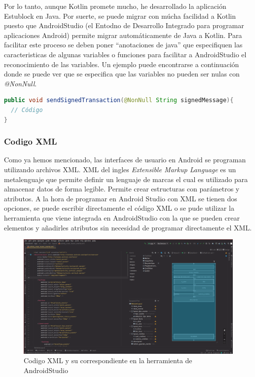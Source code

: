 Por lo tanto, aunque Kotlin promete mucho, he desarrollado la aplicación Estublock en Java. Por suerte, se puede migrar con múcha facilidad a Kotlin puesto que AndroidStudio (el Entodno de Desarrollo Integrado para programar aplicaciones Android) permite migrar automáticamente de Java a Kotlin. Para facilitar este proceso se deben poner ``anotaciones de java'' que especifiquen las caracteristicas de algunas variables o funciones para facilitar a AndroidStudio el reconocimiento de las variables. Un ejemplo puede encontrarse a continuación donde se puede ver que se especifica que las variables no pueden ser nulas con \emph{@NonNull}.

\begin{lstlisting}[language=Java,float=ht,caption={[Java] Ejemplo de ``anotación de java'' de variables para facilitar el salto a Kotlin},label=lst:java_etiquetas]
public void sendSignedTransaction(@NonNull String signedMessage){
  // Código
}
\end{lstlisting}

\subsubsection{Codigo XML}

Como ya hemos mencionado, las interfaces de usuario en Android se programan utilizando archivos XML. XML del ingles \emph{Extensible Markup Language} es un metalenguaje que permite definir un lenguaje de marcas el cual es utilizado para almacenar datos de forma legible. Permite crear estructuras con parámetros y atributos. A la hora de programar en Android Studio con XML se tienen dos opciones, se puede escribir directamente el código XML o se pude utilizar la herramienta que viene integrada en AndroidStudio con la que se pueden crear elementos y añadirles atributos sin necesidad de programar directamente el XML. 

\begin{figure}[h!]
  \centering
  \includegraphics[width=0.95\linewidth]{figs/Desarrollo/xml_vs_ezpz}
  \caption[XML]{Codigo XML y su correspondiente en la herramienta de AndroidStudio}
  \label{fig:xml_vs_ezpz}
\end{figure}

